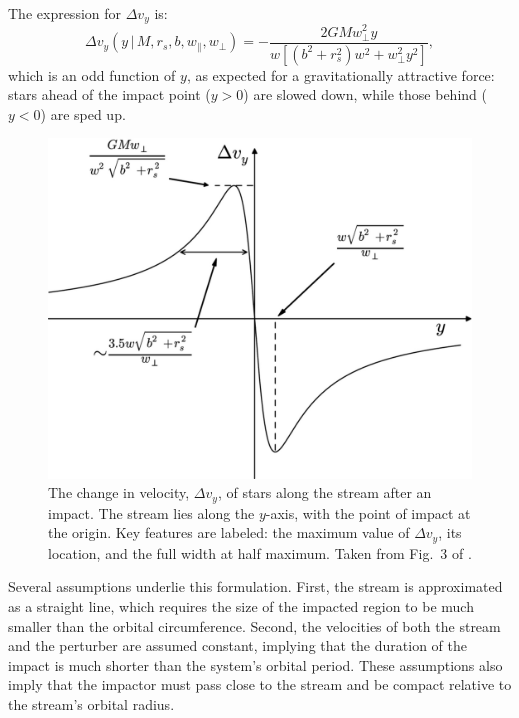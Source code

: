             The expression for $\Delta v_y$ is:
            \[
            \Delta v_y\left(y\,|\, M, r_s, b, w_\parallel, w_\perp\right) = - \frac{2GM w_\perp^2 y}{w\left[\left(b^2 + r_s^2\right)w^2 + w_\perp^2 y^2\right]},
            \]
            which is an odd function of $y$, as expected for a gravitationally attractive force: stars ahead of the impact point ($y>0$) are slowed down, while those behind ($y<0$) are sped up.

            \begin{figure}
                \centering
                \includegraphics[width=\linewidth]{images/erkal_et_al_2015_fig_3.png}
                \caption{The change in velocity, $\Delta v_y$, of stars along the stream after an impact. The stream lies along the $y$-axis, with the point of impact at the origin. Key features are labeled: the maximum value of $\Delta v_y$, its location, and the full width at half maximum. Taken from Fig.~3 of \citet{2015MNRAS.450.1136E}.}
                \label{fig:erkal_2015_fig_3}
            \end{figure}

            Several assumptions underlie this formulation. First, the stream is approximated as a straight line, which requires the size of the impacted region to be much smaller than the orbital circumference. Second, the velocities of both the stream and the perturber are assumed constant, implying that the duration of the impact is much shorter than the system's orbital period. These assumptions also imply that the impactor must pass close to the stream and be compact relative to the stream's orbital radius.

